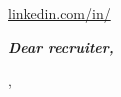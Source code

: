 \documentclass[12pt]{letter}
\begin{document}
\begin{center}
{\fontsize{35}{0}\selectfont\scshape \myname}

\href{mailto:\myemail}{\faEnvelope\enspace \myemail}\hfill
\href{https://linkedin.com/in/\mylinkedin}{\faLinkedinIn\enspace linkedin.com/in/\mylinkedin}\hfill
\href{tel:\myphone}{\faPhone\enspace \myphone}\hfill

\end{center}

\vspace{0.1in}
{\fontsize{14}{}\textbf{\textit{Dear recruiter,}}}

\vspace{-0.1in}\setlength\parindent{24pt}
\noindent


\begin{flushright}
\closer,


\myname\\
\end{flushright}
\end{document}
